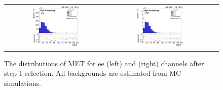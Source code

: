 \begin{figure}[ht]
  \begin{center}
    \begin{tabular}{ccc}
      \includegraphics[width=0.49\textwidth]{figures/tW/fig/Step1/ee_noNvtx/H_MET_Et.png}&
      \includegraphics[width=0.49\textwidth]{figures/tW/fig/Step1/mumu_noNvtx/H_MET_Et.png}\\
    \end{tabular}
    \caption{The distributions of MET for ee (left) and \mumu (right) channels after step 1 selection. All backgrounds are estimated from MC simulations.}
    \label{fig:step1_MET_phi}
  \end{center}
\end{figure}

